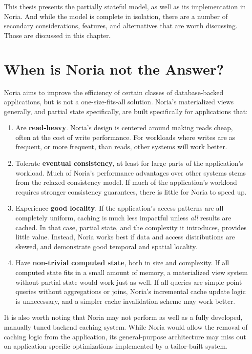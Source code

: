This thesis presents the partially stateful model, as well as its implementation
in Noria. And while the model is complete in isolation, there are a number of
secondary considerations, features, and alternatives that are worth discussing.
Those are discussed in this chapter.

\section{When is Noria not the Answer?}

Noria aims to improve the efficiency of certain classes of database-backed
applications, but is not a one-size-fits-all solution. Noria's materialized
views generally, and partial state specifically, are built specifically for
applications that:

\begin{enumerate}
  \item Are \textbf{read-heavy}. Noria's design is centered around making reads
    cheap, often at the cost of write performance. For workloads where writes
    are as frequent, or more frequent, than reads, other systems will work
    better.
  \item Tolerate \textbf{eventual consistency}, at least for large parts of the
    application's workload. Much of Noria's performance advantages over other
    systems stems from the relaxed consistency model. If much of the
    application's workload requires stronger consistency guarantees, there is
    little for Noria to speed up.
  \item Experience \textbf{good locality}. If the application's access patterns
    are all completely uniform, caching is much less impactful unless \emph{all}
    results are cached. In that case, partial state, and the complexity it
    introduces, provides little value. Instead, Noria works best if data and
    access distributions are skewed, and demonstrate good temporal and spatial
    locality.
  \item Have \textbf{non-trivial computed state}, both in size and complexity.
    If all computed state fits in a small amount of memory, a materialized view
    system without partial state would work just as well. If all queries are
    simple point queries without aggregations or joins, Noria's incremental
    cache update logic is unnecessary, and a simpler cache invalidation scheme
    may work better.
\end{enumerate}

It is also worth noting that Noria may not perform as well as a fully developed,
manually tuned backend caching system. While Noria would allow the removal of
caching logic from the application, its general-purpose architecture may miss
out on application-specific optimizations implemented by a tailor-built system.

